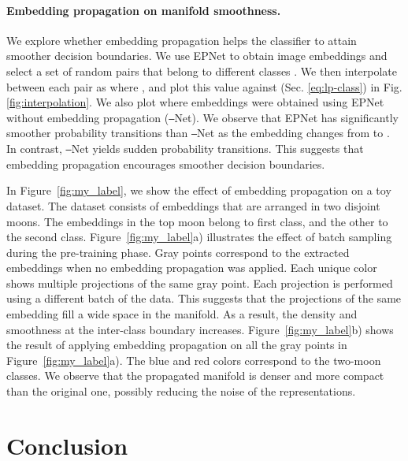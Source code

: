 \documentclass[runningheads]{llncs}
\begin{document}
\paragraph{Embedding propagation on manifold smoothness.} We explore whether  embedding propagation helps the classifier to attain smoother decision boundaries. We use EPNet to obtain image embeddings and select a set of random pairs  that belong to different classes . We then interpolate between each pair as  where , and plot this value against  (Sec. \ref{eq:lp-class}) in Fig. \ref{fig:interpolation}. We also plot  where embeddings were obtained using EPNet without embedding propagation (\texttt{--}Net). We observe that EPNet has significantly smoother probability transitions than \texttt{--}Net as the embedding  changes from  to . In contrast, \texttt{--}Net yields sudden probability transitions. This suggests that embedding propagation encourages smoother decision boundaries. 

In Figure~\ref{fig:my_label}, we show the effect of embedding propagation on a toy dataset. The dataset consists of embeddings that are arranged in two disjoint moons. The embeddings in the top moon belong to first class, and the other to the second class. Figure~\ref{fig:my_label}a) illustrates the effect of batch sampling during the pre-training phase. Gray points correspond to the extracted embeddings when no embedding propagation was applied. Each unique color shows multiple projections of the same gray point. Each projection is performed using a different batch of the data. This suggests that the projections of the same embedding fill a wide space in the manifold. As a result, the density and smoothness at the inter-class boundary increases. Figure~\ref{fig:my_label}b) shows the result of applying embedding propagation on all the gray points in Figure~\ref{fig:my_label}a). The blue and red colors correspond to the two-moon classes.  We observe that the propagated manifold is denser and more compact than the original one, possibly reducing the noise of the representations. 


\section{Conclusion}
\label{sec:conclusion}
\end{document}
